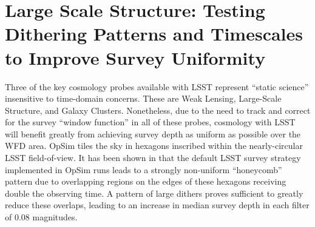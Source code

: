 %
%
%
%
%
%
%
\clearpage
\section{Large Scale Structure:  Testing Dithering Patterns and Timescales to Improve Survey Uniformity}
\def\secname{dithering}\label{sec:\secname}




Three of the key cosmology probes available with LSST represent ``static science'' insensitive to time-domain concerns.  These are Weak Lensing, Large-Scale Structure, and Galaxy Clusters.  Nonetheless, due to the need to track and correct for the survey ``window function'' in all of these probes, cosmology with LSST will benefit greatly from achieving survey depth as uniform as possible over the WFD area.  OpSim tiles the sky in hexagons inscribed within the nearly-circular LSST field-of-view.  It has been shown in \citet{CarrollEtal2014} that the default LSST survey strategy implemented in OpSim runs leads to a strongly non-uniform ``honeycomb'' pattern due to overlapping regions on the edges of these hexagons receiving double the observing time.  A pattern of large dithers proves sufficient to greatly reduce these overlaps, leading to an increase in median survey depth in each filter of 0.08 magnitudes.  

